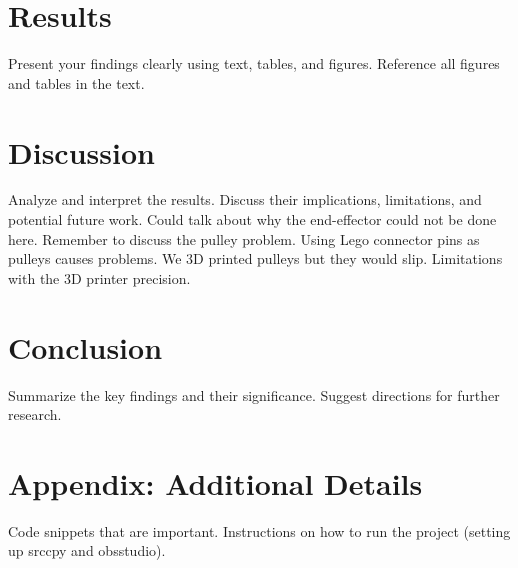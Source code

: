 \documentclass[11pt]{article}
\begin{document}
\section{Results}
Present your findings clearly using text, tables, and figures. Reference all figures and tables in the text.

\section{Discussion}
Analyze and interpret the results. Discuss their implications, limitations, and potential future work.
Could talk about why the end-effector could not be done here.
Remember to discuss the pulley problem. Using Lego connector pins as pulleys causes problems. We 3D printed pulleys
but they would slip. Limitations with the 3D printer precision.

\section{Conclusion}
Summarize the key findings and their significance. Suggest directions for further research.





\appendix
\section{Appendix: Additional Details}
Code snippets that are important. Instructions on how to run the project (setting up srccpy and obsstudio).
\end{document}
